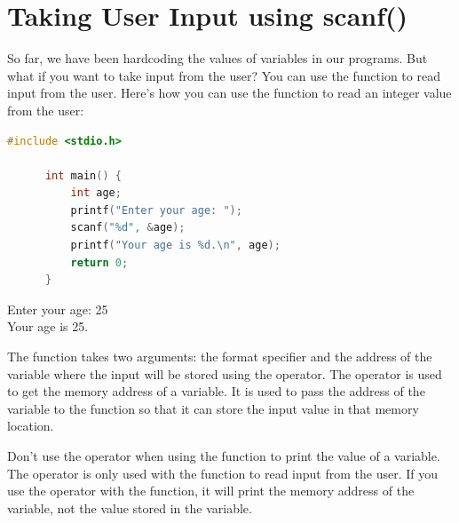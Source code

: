 \documentclass[12pt, openany]{book}
\begin{document}
  \section{Taking User Input using scanf()}
  So far, we have been hardcoding the values of variables in our programs. But what if you want to take input from the user? You can use the  function to read input from the user. Here's how you can use the  function to read an integer value from the user:
  \begin{lstlisting}[language=C, caption=Reading Integer Input from User]
      #include <stdio.h>
      
      int main() {
          int age;
          printf("Enter your age: ");
          scanf("%d", &age);
          printf("Your age is %d.\n", age);
          return 0;
      }
  \end{lstlisting}
  \begin{tcolorbox}[colback=lightgray!10, colframe=black, title=Output]
      Enter your age: 25 \\
      Your age is 25.
  \end{tcolorbox}
  \noindent The  function takes two arguments: the format specifier  and the address of the variable where the input will be stored using the \ui{\&} operator. The \ui{\&} operator is used to get the memory address of a variable. It is used to pass the address of the variable to the  function so that it can store the input value in that memory location.
  \begin{warningbox}
      Don't use the \ui{\&} operator when using the  function to print the value of a variable. The \ui{\&} operator is only used with the  function to read input from the user. If you use the \ui{\&} operator with the  function, it will print the memory address of the variable, not the value stored in the variable.
  \end{warningbox}
  
  \clearpage
  
\end{document}
